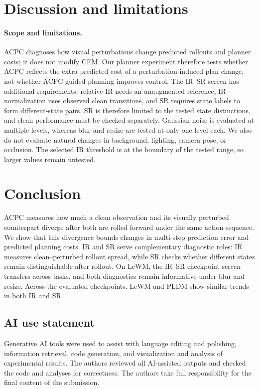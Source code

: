 \section{Discussion and limitations}\label{sec:disc}

\paragraph{Scope and limitations.}

ACPC diagnoses how visual perturbations change predicted rollouts and planner
costs; it does not modify CEM. Our planner experiment therefore tests whether
ACPC reflects the extra predicted cost of a perturbation-induced plan change,
not whether ACPC-guided planning improves control.
The IR--SR screen has additional requirements: relative IR needs an unaugmented
reference, IR normalization uses observed clean transitions, and SR requires
state labels to form different-state pairs. SR is therefore limited to the
tested state distinctions, and clean performance must be checked separately.
Gaussian noise is evaluated at multiple levels, whereas blur and resize are
tested at only one level each. We also do not evaluate natural changes in
background, lighting, camera pose, or occlusion. The selected IR threshold is
at the boundary of the tested range, so larger values remain untested.

\section{Conclusion}\label{sec:conc}

ACPC measures how much a clean observation and its visually perturbed
counterpart diverge after both are rolled forward under the same action
sequence. We show that this divergence bounds changes in multi-step prediction
error and predicted planning costs. IR and SR serve complementary diagnostic
roles: IR measures clean--perturbed rollout spread, while SR checks whether
different states remain distinguishable after rollout. On LeWM, the IR--SR
checkpoint screen transfers across tasks, and both diagnostics remain
informative under blur and resize. Across the evaluated checkpoints, LeWM and
PLDM show similar trends in both IR and SR\label{sec:main-text-end}.

\clearpage
\subsection*{AI use statement}
Generative AI tools were used to assist with language editing and polishing,
information retrieval, code generation, and visualization and analysis of
experimental results. The authors reviewed all AI-assisted outputs and
checked the code and analyses for correctness. The authors take full
responsibility for the final content of the submission.

